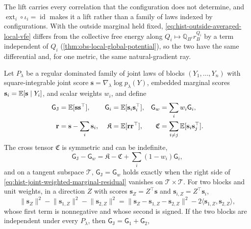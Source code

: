 The lift carries every correlation that the configuration does not determine, and
$\operatorname{ext}_i\circ\iota_i=\operatorname{id}$ makes it a lift rather than a family
of laws indexed by configurations.  With the outside marginal held fixed,
\eqref{eq:hist-outside-averaged-local-vfe} differs from the collective free energy along
$Q_i\mapsto\mathbb Q_{B^c}r_B^{Q_i}$ by a term independent of $Q_i$
(\cref{thm:obs-local-global-potential}), so the two have the same differential and, for
one metric, the same natural-gradient ray.

Let $P_\lambda$ be a regular dominated family of joint laws of blocks
$(Y_1,\dots,Y_n)$ with square-integrable joint score
$\mathbf s=\nabla_\lambda\log p_\lambda(Y)$, embedded marginal scores
$\mathbf s_i=\mathbb E[\mathbf s\mid Y_i]$, and scalar weights $w_i$, and define
\begin{align}
\mathsf G_{\mathrm J}&=\mathbb E[\mathbf s\mathbf s^\top],
&\mathsf G_i&=\mathbb E[\mathbf s_i\mathbf s_i^\top],
&\mathsf G_w&=\sum_iw_i\mathsf G_i,
\label{eq:hist-score-metrics}\\
\mathbf r&=\mathbf s-\sum_i\mathbf s_i,
&\mathfrak K&=\mathbb E[\mathbf r\mathbf r^\top],
&\mathfrak C&=\sum_{i\ne j}\mathbb E[\mathbf s_i\mathbf s_j^\top].
\label{eq:hist-score-residual-tensors}
\end{align}
The cross tensor $\mathfrak C$ is symmetric and can be indefinite,
\begin{equation}
\mathsf G_{\mathrm J}-\mathsf G_w
=\mathfrak K-\mathfrak C+\sum_i(1-w_i)\mathsf G_i,
\label{eq:hist-joint-weighted-marginal-residual}
\end{equation}
and on a tangent subspace $\mathcal T$, $\mathsf G_{\mathrm J}=\mathsf G_w$ holds exactly
when the right side of \eqref{eq:hist-joint-weighted-marginal-residual} vanishes on
$\mathcal T\times\mathcal T$.  For two blocks and unit weights, in a direction $Z$ with
scores $\mathbf s_Z=Z^\top\mathbf s$ and $\mathbf s_{i,Z}=Z^\top\mathbf s_i$,
\begin{equation}
\lVert\mathbf s_Z\rVert^2
-\lVert\mathbf s_{1,Z}\rVert^2-\lVert\mathbf s_{2,Z}\rVert^2
=\lVert\mathbf s_Z-\mathbf s_{1,Z}-\mathbf s_{2,Z}\rVert^2
-2\langle\mathbf s_{1,Z},\mathbf s_{2,Z}\rangle,
\label{eq:hist-joint-versus-product}
\end{equation}
whose first term is nonnegative and whose second is signed.  If the two blocks are
independent under every $P_\lambda$, then $\mathsf G_{\mathrm J}=\mathsf G_1+\mathsf G_2$,
